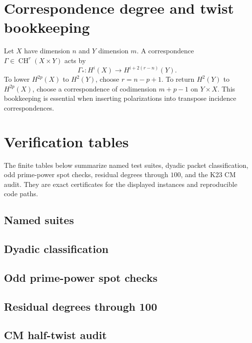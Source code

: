 \documentclass[11pt,oneside]{book}
\theoremstyle{definition}
\theoremstyle{remark}
\newcommand{\CH}{\operatorname{CH}}
\begin{document}
\chapter{Correspondence degree and twist bookkeeping}
Let $X$ have dimension $n$ and $Y$ dimension $m$. A correspondence $\Gamma\in\CH^r(X\times Y)$ acts by
\[
\Gamma_*:H^i(X)\to H^{i+2(r-n)}(Y).
\]
To lower $H^{2p}(X)$ to $H^2(Y)$, choose $r=n-p+1$. To return $H^2(Y)$ to $H^{2p}(X)$, choose a correspondence of codimension $m+p-1$ on $Y\times X$. This bookkeeping is essential when inserting polarizations into transpose incidence correspondences.



\chapter{Verification tables}
The finite tables below summarize named test suites, dyadic packet classification, odd prime-power spot checks, residual degrees through \(100\), and the K23 CM audit. They are exact certificates for the displayed instances and reproducible code paths.

\section{Named suites}


\section{Dyadic classification}


\section{Odd prime-power spot checks}


\section{Residual degrees through 100}


\section{CM half-twist audit}

\end{document}
